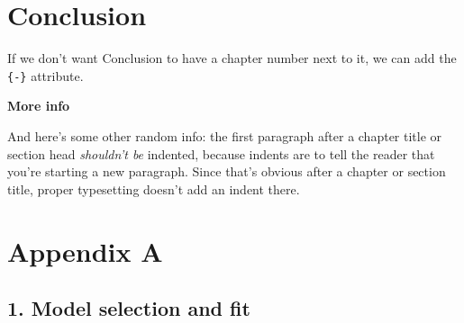 \documentclass[twoside,12pt,final]{ucthesis-CA2012}
\begin{document}
\begin{ucmainmatter}
\hypertarget{conclusion-1}{%
\chapter*{Conclusion}\label{conclusion-1}}

If we don't want Conclusion to have a chapter number next to it, we can add the \texttt{\{-\}} attribute.

\textbf{More info}

And here's some other random info: the first paragraph after a chapter title or section head \emph{shouldn't be} indented, because indents are to tell the reader that you're starting a new paragraph. Since that's obvious after a chapter or section title, proper typesetting doesn't add an indent there.

\appendix

\hypertarget{appendix-a}{%
\chapter{Appendix A}\label{appendix-a}}

\hypertarget{model-selection-and-fit}{%
\section{1. Model selection and fit}\label{model-selection-and-fit}}
\begin{table}


\end{table}
\end{ucmainmatter}
\end{document}

